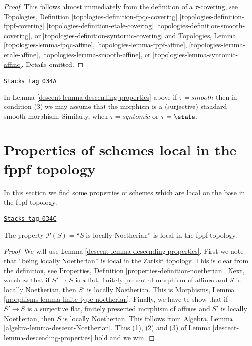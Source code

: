 \begin{proof}
This follows almost immediately from the definition of
a $\tau$-covering, see
Topologies, Definition
\ref{topologies-definition-fpqc-covering}
\ref{topologies-definition-fppf-covering}
\ref{topologies-definition-etale-covering}
\ref{topologies-definition-smooth-covering}, or
\ref{topologies-definition-syntomic-covering}
and Topologies, Lemma
\ref{topologies-lemma-fpqc-affine},
\ref{topologies-lemma-fppf-affine},
\ref{topologies-lemma-etale-affine},
\ref{topologies-lemma-smooth-affine}, or
\ref{topologies-lemma-syntomic-affine}.
Details omitted.
\end{proof}

\begin{remark}
\label{descent-remark-descending-properties-standard}
\href{https://stacks.math.columbia.edu/tag/034A}{\texttt{Stacks tag 034A}}

In Lemma \ref{descent-lemma-descending-properties} above if
$\tau = smooth$ then in condition (3) we may assume that
the morphism is a (surjective) standard smooth morphism.
Similarly, when $\tau = syntomic$ or $\tau = \etale$.
\end{remark}

\section{Properties of schemes local in the fppf topology}
\label{descent-section-descending-properties-fppf}
In this section we find some properties of schemes which are local on the base
in the fppf topology.

\begin{lemma}
\label{descent-lemma-Noetherian-local-fppf}
\href{https://stacks.math.columbia.edu/tag/034C}{\texttt{Stacks tag 034C}}

The property $\mathcal{P}(S) =$``$S$ is locally Noetherian'' is local
in the fppf topology.
\end{lemma}

\begin{proof}

We will use Lemma \ref{descent-lemma-descending-properties}.
First we note that ``being locally Noetherian'' is local
in the Zariski topology. This is clear from the definition,
see Properties, Definition \ref{properties-definition-noetherian}.
Next, we show that if $S' \to S$ is a flat, finitely presented
morphism of affines and $S$ is locally Noetherian, then $S'$ is
locally Noetherian. This is
Morphisms, Lemma \ref{morphisms-lemma-finite-type-noetherian}.
Finally, we have to show that if $S' \to S$ is a surjective
flat, finitely presented morphism of affines and $S'$ is
locally Noetherian, then $S$ is locally Noetherian. This follows from
Algebra, Lemma \ref{algebra-lemma-descent-Noetherian}.
Thus (1), (2) and (3) of Lemma \ref{descent-lemma-descending-properties} hold
and we win.
\end{proof}

